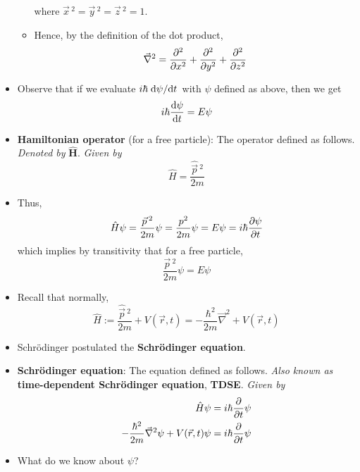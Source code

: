 \documentclass[../notes.tex]{subfiles}
\begin{document}
\begin{itemize}
\begin{itemize}
\begin{equation*}
        \end{equation*}
        where $\vec{x}{\,}^2=\vec{y}{\,}^2=\vec{z}{\,}^2=1$.
        \item Hence, by the definition of the dot product,
        \begin{equation*}
            \vec{\nabla}^2 = \pdv[2]{x}+\pdv[2]{y}+\pdv[2]{z}
        \end{equation*}
    \end{itemize}
    \item Observe that if we evaluate $i\hbar\dv*{\psi}{t}$ with $\psi$ defined as above, then we get
    \begin{equation*}
        i\hbar\dv{\psi}{t} = E\psi
    \end{equation*}
    \item \textbf{Hamiltonian operator} (for a free particle): The operator defined as follows. \emph{Denoted by} $\bm{\hat{H}}$. \emph{Given by}
    \begin{equation*}
        \hat{H} = \frac{\hat{\vec{p}}{\,}^2}{2m}
    \end{equation*}
    \item Thus,
    \begin{equation*}
        \hat{H}\psi = \frac{\vec{p}{\,}^2}{2m}\psi
        = \frac{p^2}{2m}\psi
        = E\psi
        = i\hbar\pdv{\psi}{t}
    \end{equation*}
    which implies by transitivity that for a free particle,
    \begin{equation*}
        \frac{\vec{p}{\,}^2}{2m}\psi = E\psi
    \end{equation*}
    \item Recall that normally,
    \begin{equation*}
        \hat{H} := \frac{\hat{\vec{p}}{\,}^2}{2m}+V(\vec{r},t)
        = -\frac{\hbar^2}{2m}\vec{\nabla}^2+V(\vec{r},t)
    \end{equation*}
    \item Schr\"{o}dinger postulated the \textbf{Schr\"{o}dinger equation}.
    \item \textbf{Schr\"{o}dinger equation}: The equation defined as follows. \emph{Also known as} \textbf{time-dependent Schr\"{o}dinger equation}, \textbf{TDSE}. \emph{Given by}
    \begin{align*}
        \hat{H}\psi &= i\hbar\pdv{t}\psi\\
        -\frac{\hbar^2}{2m}\vec{\nabla}^2\psi+V(\vec{r},t)\psi &= i\hbar\pdv{t}\psi
    \end{align*}
    \item What do we know about $\psi$?

\end{itemize}
\end{document}
